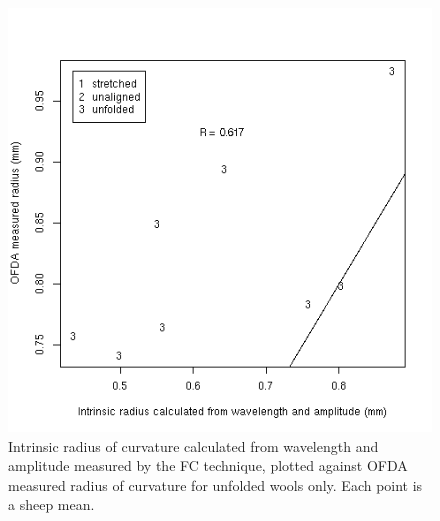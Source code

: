 %

\begin{figure}[!h]
  \centering
  \includegraphics[width=1.0\textwidth]{figwaradthetaunfoldfc.png}
  \caption{Intrinsic radius of curvature calculated from wavelength and amplitude measured by the FC technique, plotted against OFDA measured radius of curvature for unfolded wools only. Each point is a sheep mean.}
  \label{fig:waradthetaunfoldfc}
\end{figure}

%

